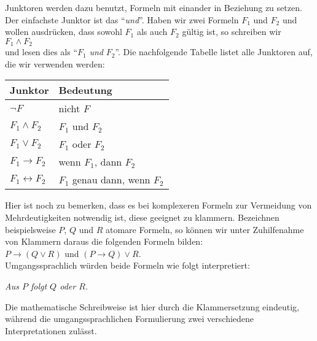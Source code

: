 \begin{enumerate}
      Junktoren werden dazu benutzt, Formeln mit einander in Beziehung zu setzen.  Der einfachste Junktor
      ist das ``\emph{und}''. Haben wir zwei Formeln $F_1$ und $F_2$ und wollen ausdr\"{u}cken, dass sowohl
      $F_1$ als auch $F_2$ g\"{u}ltig ist, so schreiben wir \\[0.2cm]
      \hspace*{1.3cm} $F_1 \wedge F_2$ \\[0.2cm]
      und lesen dies als ``$F_1$ \emph{und} $F_2$''.  Die nachfolgende Tabelle listet alle
      Junktoren auf, die wir verwenden werden: \\[0.2cm]
      \hspace*{1.3cm} 
      \begin{tabular}{|l|l|}
      \hline
      Junktor & Bedeutung \\
      \hline
      \hline
        $\neg F$ & nicht $F$ \\
      \hline
        $F_1 \wedge F_2$ & $F_1$ und $F_2$ \\
      \hline
        $F_1 \vee F_2$ & $F_1$ oder $F_2$ \\
      \hline
        $F_1 \rightarrow F_2$ & wenn $F_1$, dann $F_2$ \\
      \hline
        $F_1 \leftrightarrow F_2$ &  $F_1$ genau dann, wenn $F_2$ \\
      \hline
      \end{tabular}

      Hier ist noch zu bemerken, dass es bei komplexeren Formeln zur Vermeidung von Mehrdeutigkeiten
      notwendig ist, diese geeignet zu klammern.  Bezeichnen beispielsweise
      $P$, $Q$ und $R$ atomare Formeln,
      so k\"{o}nnen wir unter Zuhilfenahme von Klammern daraus  die folgenden Formeln bilden: \\[0.2cm]
      \hspace*{1.3cm}  $P \rightarrow (Q \vee R)$ \quad und \quad $(P \rightarrow Q) \vee R$. \\[0.2cm]
      Umgangssprachlich w\"{u}rden beide Formeln wie folgt interpretiert: 
      \begin{center}
      \begin{minipage}{12cm}
        \textsl{Aus $P$ folgt $Q$ oder $R$.}
      \end{minipage}
      \end{center}
      Die mathematische Schreibweise ist hier durch die Klammersetzung eindeutig, w\"{a}hrend
      die umgangssprachlichen Formulierung zwei verschiedene Interpretationen zul\"{a}sst.


\end{enumerate}
